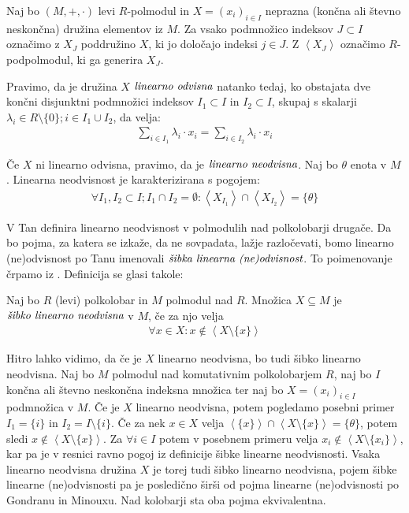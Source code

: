 \documentclass[mat1]{fmfdelo}
\newcommand{\pojem}[1]{\ensuremath{\emph{#1}}}
\newcommand{\Gen}[1]{\ensuremath{\left<{#1}\right>}}
\begin{document}
\begin{definicija}
	\label{def:linneodv1}
	Naj bo $(M, +, \cdot)$ levi $R$-polmodul in $X = (x_i)_{i \in I}$ neprazna (končna ali števno neskončna) družina elementov iz $M$. Za vsako podmnožico indeksov $J \subset I$ označimo z $X_J$ poddružino $X$, ki jo določajo indeksi $j\in J$. Z $\Gen{X_J}$ označimo $R$-podpolmodul, ki ga generira $X_J$.
	
	Pravimo, da je družina $X$ \pojem{linearno odvisna} natanko tedaj, ko obstajata dve končni disjunktni podmnožici indeksov $I_1\subset I$ in $I_2\subset I$, skupaj s skalarji $\lambda_i \in R\setminus\{0\}; i\in I_1\cup I_2$, da velja: \begin{align}
		\sum_{i \in I_1}\lambda_i\cdot x_i = \sum_{i \in I_2}\lambda_i\cdot x_i 
	\end{align}

	Če $X$ ni linearno odvisna, pravimo, da je \pojem{linearno neodvisna}. Naj bo $\theta$ enota v $M$. Linearna neodvisnost je karakterizirana s pogojem: \begin{align}
		\forall I_1, I_2 \subset I; I_1\cap I_2 =\emptyset: \Gen{X_{I_1}}\cap\Gen{X_{I_2}} = \{\theta\}
	\end{align}
\end{definicija}

V \cite[definicija 2.\,3.\,]{bib:Tanbase} Tan definira linearno neodvisnost v polmodulih nad polkolobarji drugače. Da bo pojma, za katera se izkaže, da ne sovpadata, lažje razločevati, bomo linearno (ne)odvisnost po Tanu imenovali \pojem{šibka linearna (ne)odvisnost}. To poimenovanje črpamo iz \cite[definicija 2. 12.]{bib:AkianTropSemi}. Definicija se glasi takole:
\begin{definicija}\label{def:linneodv2}
	Naj bo $R$ (levi) polkolobar in $M$ polmodul nad $R$. Množica $X\subseteq M$ je \pojem{šibko linearno neodvisna} v $M$, če za njo velja
\begin{align*}
	\forall x\in X: x \notin \Gen{X\setminus\{x\}}
\end{align*}
\end{definicija}

Hitro lahko vidimo, da če je $X$ linearno neodvisna, bo tudi šibko linearno neodvisna. Naj bo $M$ polmodul nad komutativnim polkolobarjem $R$, naj bo $I$ končna ali števno neskončna indeksna množica ter naj bo $X = (x_i)_{i\in I}$ podmnožica v $M$. 
Če je $X$ linearno neodvisna, potem pogledamo posebni primer $I_1 = \{i\}$ in $I_2 = I\setminus\{i\}$. Če za nek $x\in X$ velja $\Gen{\{x\}}\cap \Gen{X\setminus\{x\}} = \{\theta\}$, potem sledi $x\notin \Gen{X\setminus\{x\}}$. Za $\forall i \in I$ potem v posebnem primeru velja $x_i \notin \Gen{X\setminus\{x_i\}}$, kar pa je v resnici ravno pogoj iz definicije šibke linearne neodvisnosti. Vsaka linearno neodvisna družina $X$ je torej tudi šibko linearno neodvisna, pojem šibke linearne (ne)odvisnosti pa je posledično širši od pojma linearne (ne)odvisnosti po Gondranu in Minouxu. Nad kolobarji sta oba pojma ekvivalentna.
\end{document}
